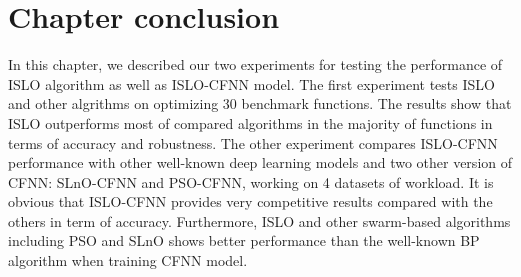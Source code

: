 \documentclass[../main.tex]{subfiles}
\begin{document}
\section{Chapter conclusion}
  In this chapter, we described our two experiments for testing the performance of ISLO algorithm as well as ISLO-CFNN model. The first experiment tests ISLO and other algrithms on optimizing 30 benchmark functions. The results show that ISLO outperforms most of compared algorithms in the majority of functions in terms of accuracy and robustness. The other experiment compares ISLO-CFNN performance with other well-known deep learning models and two other version of CFNN: SLnO-CFNN and PSO-CFNN, working on 4 datasets of workload. It is obvious that ISLO-CFNN provides very competitive results compared with the others in term of accuracy. Furthermore, ISLO and other swarm-based algorithms including PSO and SLnO shows better performance than the well-known BP algorithm when training CFNN model.
\end{document}

